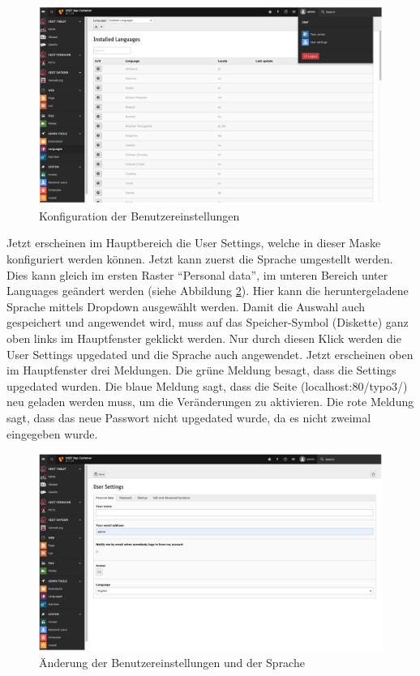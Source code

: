 \begin{figure}[ht!]
\centering
\includegraphics[width=12cm]{Figures/paula/typo3/benutzereinstellungen.png}
\caption{Konfiguration der Benutzereinstellungen}
\label{img:benutzereinstellungen}
\end{figure}

Jetzt erscheinen im Hauptbereich die User Settings, welche in dieser Maske konfiguriert werden können. Jetzt kann zuerst die Sprache umgestellt werden. Dies kann gleich im ersten Raster “Personal data”, im unteren Bereich unter Languages geändert werden (siehe Abbildung \ref{img:benutzereinstellungen_sprache}). Hier kann die heruntergeladene Sprache mittels Dropdown ausgewählt werden. Damit die Auswahl auch gespeichert und angewendet wird, muss auf das Speicher-Symbol (Diskette) ganz oben links im Hauptfenster geklickt werden. Nur durch diesen Klick werden die User Settings upgedated und die Sprache auch angewendet. Jetzt erscheinen oben im Hauptfenster drei Meldungen. Die grüne Meldung besagt, dass die Settings upgedated wurden. Die blaue Meldung sagt, dass die Seite (localhost:80/typo3/) neu geladen werden muss, um die Veränderungen zu aktivieren. Die rote Meldung sagt, dass das neue Passwort nicht upgedated wurde, da es nicht zweimal eingegeben wurde.

\begin{figure}[ht!]
\centering
\includegraphics[width=12cm]{Figures/paula/typo3/benutzereinstellungen_sprache.png}
\caption{Änderung der Benutzereinstellungen und der Sprache}
\label{img:benutzereinstellungen_sprache}
\end{figure}

